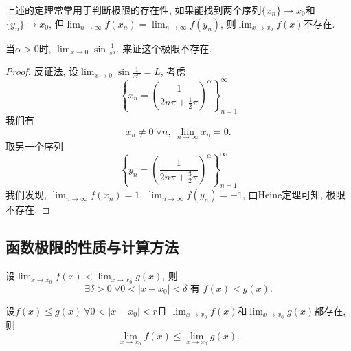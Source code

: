 
上述的定理常常用于判断极限的存在性, 如果能找到两个序列$\{ x_n \} \to x_0$和$\{ y_n \}\to x_0$, 但$\lim_{n \to \infty} f\left( x_n \right) = \lim_{n \to \infty}f\left( y_n \right) $, 则$\lim_{x \to x_0} f\left( x \right) $不存在.

\begin{example}
    当$\alpha > 0 $时, $\lim_{x \to 0} \sin \frac{1}{s^{\alpha}}$. 来证这个极限不存在.
    \begin{proof}
        反证法, 设$\lim_{x \to 0}\sin \frac{1}{x^{\alpha}} = L$, 考虑
        \begin{equation}
          \left\{ x_n = \left( \frac{1}{2n \pi +\frac{1}{2}\pi} \right) ^{\alpha} \right\}_{n=1}^{\infty}
        \end{equation}
        我们有
        \begin{equation}
          x_n \neq 0\ \forall n, \ \lim_{n \to \infty} x_n = 0.
        \end{equation}
        取另一个序列
        \begin{equation}
          \left\{ y_n = \left( \frac{1}{2n\pi + \frac{3}{2}\pi} \right) ^{\alpha} \right\} _{n=1}^{\infty}
        \end{equation}
        我们发现, $\lim_{n \to \infty} f\left( x_n \right) = 1,\ \lim_{n \to \infty}f\left( y_n \right) = -1$, 由Heine定理可知, 极限不存在.
    \end{proof}
\end{example}

\subsection{函数极限的性质与计算方法}
\begin{proposition}\label{保持极限不等式}
    设$\displaystyle \lim_{x \to x_0} f\left( x \right) < \lim_{x \to x_0} g\left( x \right) $, 则
    \begin{equation}
      \exists \delta > 0 \ \forall 0 < \left| x-x_0 \right| < \delta \text{ 有 } f\left( x \right) < g\left( x \right) .
    \end{equation}
\end{proposition}

\begin{proposition}
    设$f\left( x \right) \le  g\left( x \right) \ \forall 0 < \left| x-x_0 \right| < r$且 $\displaystyle \lim_{x \to x_0} f\left( x \right) $和$\displaystyle  \lim_{x \to x_0} g\left( x \right) $都存在, 则
    \begin{equation}
      \lim_{x \to x_0} f\left( x \right) \le \lim_{x \to x_0} g\left( x \right) .
    \end{equation}
\end{proposition}

